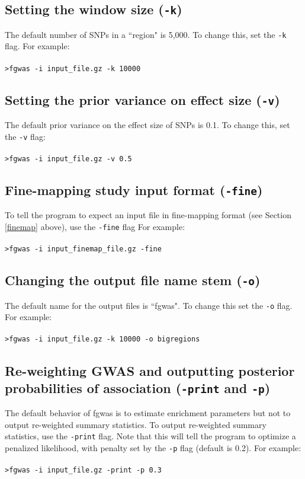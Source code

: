 \documentclass[11pt,titlepage]{article}
\begin{document}
\subsection{Setting the window size (\texttt{-k})}
The default number of SNPs in a ``region" is 5,000. To change this, set the \texttt{-k} flag. For example:
\\
\\
\noindent \texttt{>fgwas -i input\_file.gz -k 10000}\\

\subsection{Setting the prior variance on effect size (\texttt{-v})}
The default prior variance on the effect size of SNPs is 0.1. To change this, set the \texttt{-v} flag:
\\
\\
\noindent \texttt{>fgwas -i input\_file.gz -v 0.5}\\

\subsection{Fine-mapping study input format (\texttt{-fine})}
To tell the program to expect an input file in fine-mapping format (see Section \ref{finemap} above), use the \texttt{-fine} flag For example:
\\
\\
\texttt{>fgwas -i input\_finemap\_file.gz -fine}

\subsection{Changing the output file name stem (\texttt{-o})}
The default name for the output files is ``fgwas". To change this set the \texttt{-o} flag. For example:
\\
\\
\texttt{>fgwas -i input\_file.gz -k 10000 -o bigregions}


\subsection{Re-weighting GWAS and outputting posterior probabilities of association (\texttt{-print} and \texttt{-p})}
The default behavior of fgwas is to estimate enrichment parameters but not to output re-weighted summary statistics. To output re-weighted summary statistics, use the \texttt{-print} flag. Note that this will tell the program to optimize a penalized likelihood, with penalty set by the \texttt{-p} flag (default is 0.2). For example:
\\
\\
\texttt{>fgwas -i input\_file.gz -print -p 0.3}
\end{document}
